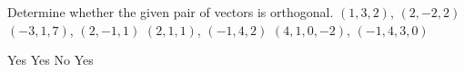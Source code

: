 
\begin{Exercise}[
name={},
title={}, 
difficulty=0,
origin={\cite{SM}}]
Determine whether the given pair of vectors is orthogonal.
\Question $(1,3,2)$, $(2,-2,2)$
\Question $(-3,1,7)$, $(2,-1,1)$
\Question $(2,1,1)$, $(-1,4,2)$
\Question $(4,1,0,-2)$, $(-1,4,3,0)$
\end{Exercise}

\begin{Answer}
\Question Yes
\Question Yes
\Question No
\Question Yes
\end{Answer}
